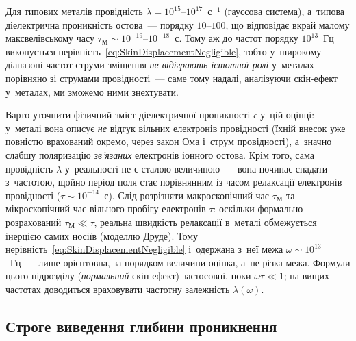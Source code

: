 Для типових металів провідність $\lambda = 10^{15}$--$10^{17}$~с$^{-1}$ (гауссова
система), а~типова діелектрична проникність остова~--- порядку $10$--$100$, що відповідає
вкрай малому максвелівському часу $\tau_\text{М} \sim 10^{-19}$--$10^{-18}$~с. Тому аж до
частот порядку $10^{13}$~Гц виконується нерівність~\eqref{eq:SkinDisplacementNegligible},
тобто у~широкому діапазоні частот струми зміщення \emph{не відіграють істотної ролі}
у~металах порівняно зі струмами провідності~--- саме тому надалі, аналізуючи скін-ефект
у~металах, ми зможемо ними знехтувати.

\begin{Attention}
	Варто уточнити фізичний зміст діелектричної проникності $\epsilon$ у~цій оцінці:
	у~металі вона описує \emph{не} відгук вільних електронів провідності (їхній внесок
	уже повністю врахований окремо, через закон Ома і~струм провідності), а~значно слабшу
	поляризацію \emph{зв'язаних} електронів іонного остова. Крім того, сама провідність
	$\lambda$ у~реальності не є сталою величиною~--- вона починає спадати з~частотою,
	щойно період поля стає порівнянним із часом релаксації електронів провідності ($\tau
	\sim 10^{-14}$~с). Слід розрізняти макроскопічний час $\tau_\text{М}$ та
	мікроскопічний час вільного пробігу електронів $\tau$: оскільки формально розрахований
	$\tau_\text{М} \ll \tau$, реальна швидкість релаксації в~металі обмежується інерцією
	самих носіїв (моделлю Друде). Тому нерівність~\eqref{eq:SkinDisplacementNegligible}
	і~одержана з~неї межа $\omega\sim10^{13}$~Гц~--- лише орієнтовна, за порядком величини
	оцінка, а~не різка межа. Формули цього підрозділу (\emph{нормальний} скін-ефект)
	застосовні, поки $\omega\tau\ll1$; на вищих частотах доводиться враховувати частотну
	залежність $\lambda(\omega)$.
\end{Attention}


\subsection*{Строге виведення глибини проникнення}


